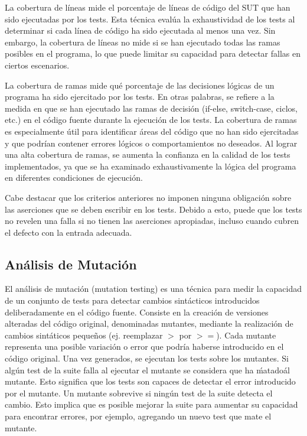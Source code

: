La cobertura de líneas mide el porcentaje de
líneas de código del SUT que han sido ejecutadas por los tests. 
Esta técnica evalúa la exhaustividad de los tests al determinar si cada línea de código ha sido ejecutada al menos una vez. 
Sin embargo, la cobertura de líneas no mide si se han ejecutado todas las ramas
posibles en el programa, lo que puede limitar su capacidad para detectar fallas
en ciertos escenarios.

La cobertura de ramas mide qué porcentaje de las
decisiones lógicas de un programa ha sido ejercitado por los tests. En otras
palabras, se refiere a la medida en que se han ejecutado las ramas de decisión
(if-else, switch-case, ciclos, etc.) en el código fuente durante la ejecución de
los tests. La cobertura de ramas es especialmente útil para identificar áreas del 
código que no han sido ejercitadas y que podrían contener errores lógicos o comportamientos no deseados.
Al lograr una alta cobertura de ramas, se aumenta la confianza en la calidad de
los tests implementados, ya que se ha examinado exhaustivamente la lógica del programa 
en diferentes condiciones de ejecución.

Cabe destacar que los criterios anteriores no imponen ninguna obligación sobre
las aserciones que se deben escribir en los tests. Debido a esto, puede que los
tests no revelen una falla si no tienen las aserciones apropiadas, incluso
cuando cubren el defecto con la entrada adecuada.  

\subsection{Análisis de Mutación}

El análisis de mutación (mutation testing) es una técnica para medir la
capacidad de un conjunto de tests para detectar cambios sintácticos
introducidos deliberadamente en el código fuente. Consiste en la creación de versiones 
alteradas del código original, denominadas mutantes, mediante la realización de
cambios sintáticos pequeños (ej. reemplazar $>$ por $>=$). Cada mutante representa una 
posible variación o error que podría haberse introducido en el código original.
Una vez generados, se ejecutan los tests sobre los mutantes. 
Si algún test de la suite falla al ejecutar el mutante se considera que ha
\'matado\' al mutante. Esto significa que los tests son capaces de detectar el error 
introducido por el mutante. Un mutante sobrevive si ningún test de la suite 
detecta el cambio. Esto implica que es posible mejorar la suite para aumentar su capacidad 
para encontrar errores, por ejemplo, agregando un nuevo test que mate el mutante.

